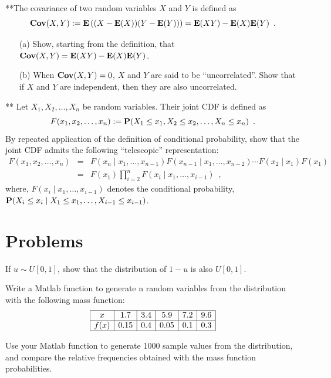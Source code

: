 \begin{ExerciseList}
\Exercise
{**}The covariance of two random variables $X$ and $Y$ is defined as
\[
\mathbf{Cov}(X,Y) := \mathbf{E} \left((X-\mathbf{E}(X))(Y-\mathbf{E}(Y))\right) = \mathbf{E}(X Y) - \mathbf{E}(X) \mathbf{E}(Y) \enspace .
\]
\begin{itemize}
\item[(a)] Show, starting from the definition, that $\mathbf{Cov}(X,Y) = \mathbf{E}(XY)-\mathbf{E}(X) \mathbf{E}(Y)$.
\item[(b)] When $\mathbf{Cov}(X,Y)=0$, $X$ and $Y$ are said to be ``uncorrelated''.  
Show that if $X$ and $Y$ are independent, then they are also uncorrelated.
\end{itemize}

\Exercise
{**} Let $X_1,X_2,\ldots,X_n$ be random variables.  
Their joint CDF is defined as 
\[
F(x_1,x_2,\ldots,x_n) := \mathbf{P} (X_1 \leq x_1, X_2 \leq x_2, \ldots, X_n \leq x_n) \enspace.
\]
By repeated application of the definition of conditional probability, show that the joint CDF admits the following ``telescopic'' representation:
\begin{eqnarray*}
F(x_1,x_2,\ldots,x_n)
&=&
F(x_n \mid x_1,\ldots,x_{n-1}) F(x_{n-1} \mid x_1,\ldots,x_{n-2})\cdots F(x_2 \mid x_1) F(x_1)\\
&=&
F(x_1) \prod_{i=2}^n F(x_i \mid x_1,\ldots,x_{i-1}) \enspace ,
\end{eqnarray*}
where, $F(x_i \mid x_1,\ldots,x_{i-1})$ denotes the conditional probability, $\mathbf{P}(X_i \leq x_i \mid X_1 \leq x_1,\ldots,X_{i-1} \leq x_{i-1})$. 
\end{ExerciseList}

\section{Problems}
\begin{exercise}
If $u\sim U[0,1]$, show that the distribution of $1-u$ is also $U[0,1]$.
\end{exercise}

\begin{exercise}
Write a Matlab function to generate n random variables from the distribution with the following mass function:
$$\begin{array}{|c|c|c|c|c|c|}\hline
x	&1.7	&3.4	&5.9	&7.2&	9.6\\ \hline
f(x)	&0.15&	0.4	&0.05	&0.1	&0.3\\ \hline
\end{array}$$

Use your Matlab function to generate 1000 sample values from the distribution, and compare the relative frequencies obtained with the mass function probabilities.
\end{exercise}

